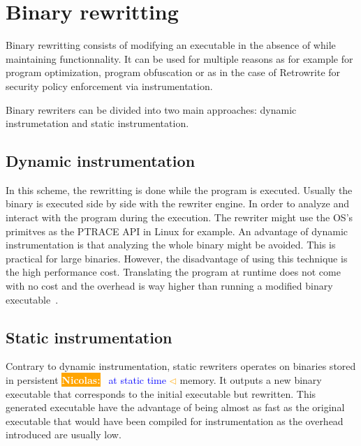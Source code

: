 \documentclass[a4paper,11pt,oneside]{report}
\newcommand{\sysname}{Retrowrite\xspace}
\newcommand{\todobox}[3]{%
    \colorbox{#1}{\textcolor{white}{\sffamily\bfseries\scriptsize #2}}%
    ~\textcolor{blue}{#3} %
    \textcolor{#1}{$\triangleleft$}%
}
\newcommand{\nb}[1]{\todobox{orange}{Nicolas:}{#1}}
\begin{document}
\section{Binary rewritting}
Binary rewritting consists of modifying an executable in the absence of
while maintaining functionnality.
It can be used for multiple reasons as for example for program optimization,
program obfuscation or as in the case of \sysname for security policy
enforcement via instrumentation. 


Binary rewriters can be divided into two
main approaches: dynamic instrumetation
and static instrumentation.

\subsection{Dynamic instrumentation}
In this scheme, the rewritting is done while the program is executed. Usually
the binary is executed side by side with the rewriter engine. In order
to analyze and interact with the program during the execution. The rewriter
might use the OS's primitves as the PTRACE API in Linux for example.  
An advantage of dynamic instrumentation is that analyzing the whole binary might
be avoided.  This is practical for large binaries. However, the disadvantage of
using this technique is the high performance cost. Translating the program at
runtime does not come with no cost and the overhead is way higher than running
a modified binary executable~\cite{dinesh20oakland}.


\subsection{Static instrumentation}
Contrary to dynamic instrumentation, static rewriters operates on binaries stored in
persistent \nb{at static time } memory. It outputs a new binary executable that
corresponds to the initial executable but rewritten. This generated executable have the
advantage of being almost as fast as the original executable that would have
been compiled for instrumentation as the overhead introduced are usually low.
\end{document}
